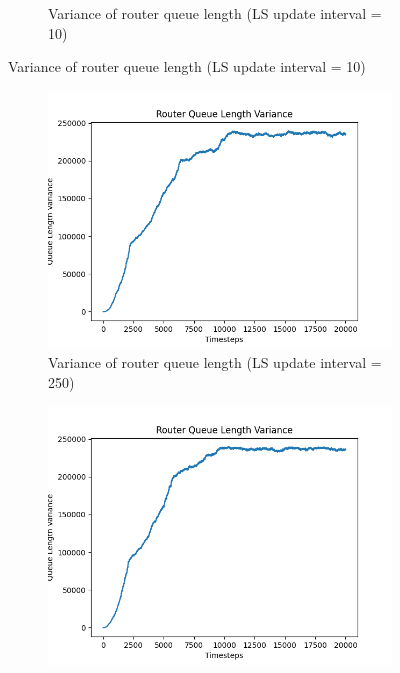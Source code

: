 \begin{appendices}
\begin{figure}[H]
\begin{subfigure}[b]{0.475\textwidth}
            \caption[]{Variance of router queue length (LS update interval = 10)}
            \label{fig:qvar-10}
        \end{subfigure}
    \end{figure}
    \begin{figure}[H]\ContinuedFloat
        \centering
        \begin{subfigure}[b]{0.475\textwidth}
            \centering
            \includegraphics[width=\textwidth]{figs/appendix/variance_ls=250.png}
            \caption[]{Variance of router queue length (LS update interval = 250)}
            \label{fig:qvar-250}
        \end{subfigure}
        \hfill
        \begin{subfigure}[b]{0.475\textwidth}
            \centering
            \includegraphics[width=\textwidth]{figs/appendix/variance_ls=500.png}

\end{subfigure}
\end{figure}
\end{appendices}
